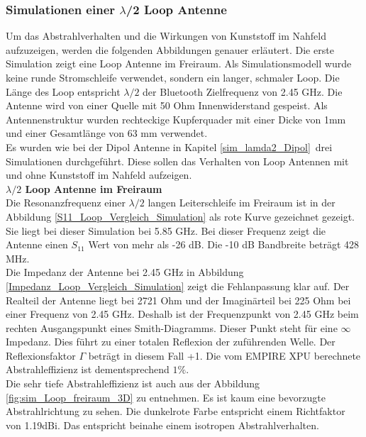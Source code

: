 \subsubsection{Simulationen einer $\lambda$/2 Loop Antenne}\label{sec:SimL2Loop}
Um das Abstrahlverhalten und die Wirkungen von Kunststoff im Nahfeld aufzuzeigen, werden die folgenden Abbildungen genauer erläutert.
Die erste Simulation zeigt eine Loop Antenne im Freiraum. Als Simulationsmodell wurde keine runde Stromschleife verwendet, sondern ein langer, schmaler Loop. Die Länge des Loop entspricht $\lambda/2$ der Bluetooth Zielfrequenz von 2.45 GHz. Die Antenne wird von einer Quelle mit 50 Ohm Innenwiderstand gespeist. Als Antennenstruktur wurden rechteckige Kupferquader mit einer Dicke von 1mm  und einer Gesamtlänge von 63 mm verwendet.\\

Es wurden wie bei der Dipol Antenne in Kapitel \ref{sim_lamda2_Dipol}\ drei Simulationen durchgeführt. Diese sollen das Verhalten von Loop Antennen mit und ohne Kunststoff im Nahfeld aufzeigen.\\ 

\textbf{$\lambda/2$ Loop Antenne im Freiraum}\\
Die Resonanzfrequenz einer $\lambda/2$ langen Leiterschleife im Freiraum ist in der Abbildung \ref{S11_Loop_Vergleich_Simulation} als rote Kurve gezeichnet gezeigt. Sie liegt bei dieser Simulation bei 5.85 GHz. Bei dieser Frequenz zeigt die Antenne einen $S_{11}$ Wert von mehr als -26 dB. Die -10 dB Bandbreite beträgt 428 MHz.\\
Die Impedanz der Antenne bei 2.45 GHz in Abbildung \ref{Impedanz_Loop_Vergleich_Simulation} zeigt die Fehlanpassung klar auf. Der Realteil der Antenne liegt bei 2721 Ohm und der Imaginärteil bei 225 Ohm bei einer Frequenz von 2.45 GHz. Deshalb ist der Frequenzpunkt von 2.45 GHz beim rechten Ausgangspunkt eines Smith-Diagramms. Dieser Punkt steht für eine $\infty$ Impedanz. Dies führt zu einer totalen Reflexion der zuführenden Welle. Der Reflexionsfaktor $\Gamma$ beträgt in diesem Fall +1. Die vom EMPIRE XPU berechnete Abstrahleffizienz ist dementsprechend $1\%$.\\

Die sehr tiefe Abstrahleffizienz ist auch aus der Abbildung \ref{fig:sim_Loop_freiraum_3D} zu entnehmen. Es ist kaum eine bevorzugte Abstrahlrichtung zu sehen. Die dunkelrote Farbe entspricht einem Richtfaktor von 1.19dBi. Das entspricht beinahe einem isotropen Abstrahlverhalten.\\

